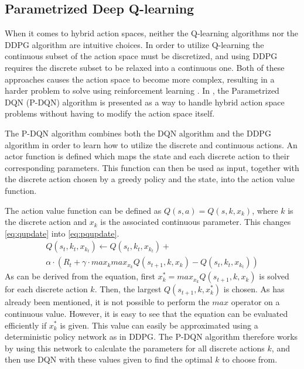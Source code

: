 \documentclass{kththesis}
\begin{document}
\subsection{Parametrized Deep Q-learning}
When it comes to hybrid action spaces, neither the Q-learning algorithms nor the DDPG algorithm are intuitive choices. In order to utilize Q-learning the continuous subset of the action space must be discretized, and using DDPG requires the discrete subset to be relaxed into a continuous one. Both of these approaches causes the action space to become more complex, resulting in a harder problem to solve using reinforcement learning \parencite{xiong2018parametrized}. In \textcite{xiong2018parametrized}, the Parametrized DQN (P-DQN) algorithm is presented as a way to handle hybrid action space problems without having to modify the action space itself.

The P-DQN algorithm combines both the DQN algorithm and the DDPG algorithm in order to learn how to utilize the discrete and continuous actions. An actor function is defined which maps the state and each discrete action to their corresponding parameters. This function can then be used as input, together with the discrete action chosen by a greedy policy and the state, into the action value function. 

The action value function can be defined as $Q(s, a) = Q(s, k, x_k)$, where $k$ is the discrete action and $x_k$ is the associated continuous parameter. This changes \autoref{eq:qupdate} into \autoref{eq:pqupdate}. 
\begin{equation}
\label{eq:pqupdate}
\begin{split}
Q(s_t, k_t, x_{k_t}) \leftarrow Q(s_t, k_t, x_{k_t}) + \\ \alpha \cdot (R_t + \gamma \cdot max_k max_{x_k} Q(s_{t+1}, k, x_k) - Q(s_t, k_t, x_{k_t}))
\end{split}
\end{equation}
As can be derived from the equation, first $x_k^* = max_{x_k}Q(s_{t+1}, k, x_k)$ is solved for each discrete action $k$. Then, the largest $Q(s_{t+1}, k, x_k^*)$ is chosen. As has already been mentioned, it is not possible to perform the $max$ operator on a continuous value. However, it is easy to see that the equation can be evaluated efficiently if $x_k^*$ is given. This value can easily be approximated using a deterministic policy network as in DDPG. The P-DQN algorithm therefore works by using this network to calculate the parameters for all discrete actions $k$, and then use DQN with these values given to find the optimal $k$ to choose from. \parencite{xiong2018parametrized}
\end{document}
